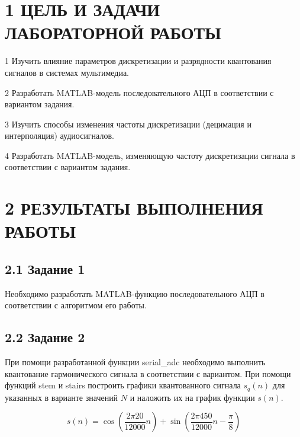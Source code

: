 \documentclass[a4paper,14pt]{extarticle}
\begin{document}
\thispagestyle{empty} 
\setcounter{page}{2}

\section*{1 ЦЕЛЬ И ЗАДАЧИ ЛАБОРАТОРНОЙ РАБОТЫ}
  1 Изучить влияние параметров дискретизации и разрядности квантования сигналов в
системах мультимедиа.

  2 Разработать MATLAB-модель последовательного АЦП в соответствии с вариантом
задания.

  3 Изучить способы изменения частоты дискретизации (децимация и интерполяция)
аудиосигналов.

  4 Разработать MATLAB-модель, изменяющую частоту дискретизации сигнала в
соответствии с вариантом задания.

\section*{2 РЕЗУЛЬТАТЫ ВЫПОЛНЕНИЯ РАБОТЫ}
\subsection*{2.1 Задание 1}
  Необходимо разработать MATLAB-функцию последовательного АЦП в
соответствии с алгоритмом его работы.



\subsection*{2.2 Задание 2}
При помощи разработанной функции serial\_adc необходимо 
выполнить квантование гармонического сигнала в соответствии с 
вариантом. При помощи функций stem и stairs построить графики 
квантованного сигнала $s_q(n)$ для указанных в варианте
значений $N$ и наложить их на график функции $s(n)$.

\[s(n) = \cos(\dfrac{2\pi20}{12000}n) + \sin(\dfrac{2\pi450}{12000}n - \dfrac{\pi}{8})\]


\end{document}
